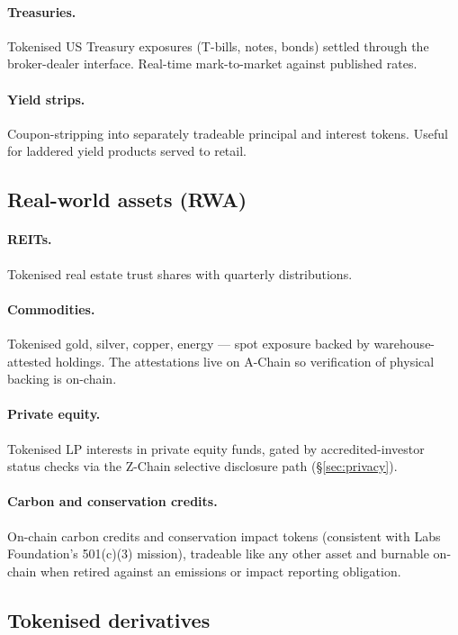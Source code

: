 \paragraph{Treasuries.}
Tokenised US Treasury exposures (T-bills, notes, bonds) settled
through the \Liquidity{} broker-dealer interface. Real-time
mark-to-market against published rates.

\paragraph{Yield strips.}
Coupon-stripping into separately tradeable principal and interest
tokens. Useful for laddered yield products served to retail.

\subsection{Real-world assets (RWA)}

\paragraph{REITs.}
Tokenised real estate trust shares with quarterly distributions.

\paragraph{Commodities.}
Tokenised gold, silver, copper, energy --- spot exposure backed by
warehouse-attested holdings. The attestations live on A-Chain
\cite{lp-134} so verification of physical backing is on-chain.

\paragraph{Private equity.}
Tokenised LP interests in private equity funds, gated by
accredited-investor status checks via the Z-Chain selective
disclosure path (\S\ref{sec:privacy}).

\paragraph{Carbon and conservation credits.}
On-chain carbon credits and conservation impact tokens (consistent
with \Zoo{} Labs Foundation's 501(c)(3) mission), tradeable like any
other asset and burnable on-chain when retired against an emissions
or impact reporting obligation.

\subsection{Tokenised derivatives}

